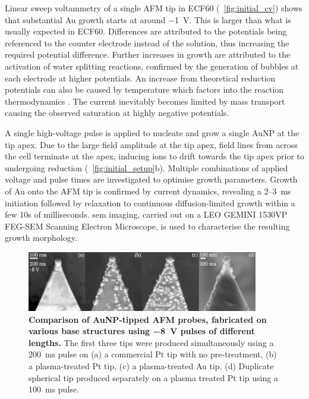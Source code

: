 \documentclass{article}
\begin{document}
Linear sweep voltammetry of a single AFM tip in ECF60 (\figurename~\ref{fig:initial_cv}) shows that substantial Au growth starts at around \SI{-1}{V}. This is larger than what is usually expected in ECF60. Differences are attributed to the potentials being referenced to the counter electrode instead of the solution, thus increasing the required potential difference. Further increases in growth are attributed to the activation of water splitting reactions, confirmed by the generation of bubbles at each electrode at higher potentials. An increase from theoretical reduction potentials can also be caused by temperature which factors into the reaction thermodynamics \cite{paunovic2006fundamentals}. The current inevitably becomes limited by mass transport causing the observed saturation at highly negative potentials.

A single high-voltage pulse is applied to nucleate and grow a single AuNP at the tip apex. Due to the large field amplitude at the tip apex, field lines from across the cell terminate at the apex, inducing ions to drift towards the tip apex prior to undergoing reduction (\figurename~\ref{fig:initial_setup}b).  Multiple combinations of applied voltage and pulse times are investigated to optimise growth parameters. Growth of Au onto the AFM tip is confirmed by current dynamics, revealing a 2--\SI{3}{ms} initiation followed by relaxation to continuous diffusion-limited growth within a few 10s of milliseconds. \Gls{sem} imaging, carried out on a LEO GEMINI 1530VP FEG-SEM Scanning Electron Microscope, is used to characterise the resulting growth morphology.

\begin{figure}[bt]
\centering
\includegraphics[width=0.9\textwidth]{figures/figure_2}
\caption[Comparison of AuNP-tipped AFM probes, fabricated on various base structures using \SI{-8}{V} pulses of different lengths]{\textbf{Comparison of AuNP-tipped AFM probes, fabricated on various base structures using \SI{-8}{V} pulses of different lengths.} The first three tips were produced simultaneously using a \SI{200}{ms} pulse on (a) a commercial Pt tip with no pre-treatment, (b) a plasma-treated Pt tip, (c) a plasma-treated Au tip. (d) Duplicate spherical tip produced separately on a plasma treated Pt tip using a \SI{100}{ms} pulse.}
\label{fig:electrochemical_tips}
\end{figure}
\end{document}
